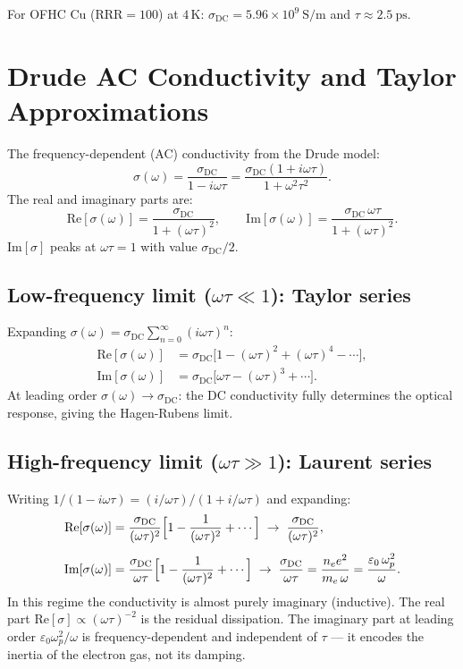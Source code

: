 \documentclass[11pt]{article}
\begin{document}
For OFHC Cu ($\mathrm{RRR}=100$) at $4\,\mathrm{K}$:
$\sigma_\mathrm{DC} = 5.96\times10^{9}\ \mathrm{S/m}$ and
$\tau \approx 2.5\ \mathrm{ps}$.

\section{Drude AC Conductivity and Taylor Approximations}
\label{sec:ac}

The frequency-dependent (AC) conductivity from the Drude model:
\[
  \sigma(\omega)
  = \frac{\sigma_\mathrm{DC}}{1 - i\omega\tau}
  = \frac{\sigma_\mathrm{DC}(1+i\omega\tau)}{1+\omega^2\tau^2}.
\]
The real and imaginary parts are:
\[
  \mathrm{Re}[\sigma(\omega)] = \frac{\sigma_\mathrm{DC}}{1+(\omega\tau)^2},
  \qquad
  \mathrm{Im}[\sigma(\omega)] = \frac{\sigma_\mathrm{DC}\,\omega\tau}{1+(\omega\tau)^2}.
\]
$\mathrm{Im}[\sigma]$ peaks at $\omega\tau = 1$ with value $\sigma_\mathrm{DC}/2$.

\subsection*{Low-frequency limit ($\omega\tau \ll 1$): Taylor series}

Expanding $\sigma(\omega) = \sigma_\mathrm{DC}\sum_{n=0}^\infty(i\omega\tau)^n$:
\begin{align*}
  \mathrm{Re}[\sigma(\omega)] &= \sigma_\mathrm{DC}
    \bigl[1 - (\omega\tau)^2 + (\omega\tau)^4 - \cdots\bigr], \\
  \mathrm{Im}[\sigma(\omega)] &= \sigma_\mathrm{DC}
    \bigl[\omega\tau - (\omega\tau)^3 + \cdots\bigr].
\end{align*}
At leading order $\sigma(\omega)\to\sigma_\mathrm{DC}$: the DC conductivity
fully determines the optical response, giving the Hagen-Rubens limit.

\subsection*{High-frequency limit ($\omega\tau \gg 1$): Laurent series}

Writing $1/(1-i\omega\tau) = (i/\omega\tau)/(1+i/\omega\tau)$ and expanding:
\begin{align*}
  \mathrm{Re}[\sigma(\omega)] &= \frac{\sigma_\mathrm{DC}}{(\omega\tau)^2}
    \Bigl[1 - \frac{1}{(\omega\tau)^2} + \cdots\Bigr]
    \;\to\; \frac{\sigma_\mathrm{DC}}{(\omega\tau)^2}, \\[4pt]
  \mathrm{Im}[\sigma(\omega)] &= \frac{\sigma_\mathrm{DC}}{\omega\tau}
    \Bigl[1 - \frac{1}{(\omega\tau)^2} + \cdots\Bigr]
    \;\to\; \frac{\sigma_\mathrm{DC}}{\omega\tau}
           = \frac{n_e e^2}{m_e\,\omega}
           = \frac{\varepsilon_0\,\omega_p^2}{\omega}.
\end{align*}
In this regime the conductivity is almost purely imaginary (inductive).
The real part $\mathrm{Re}[\sigma]\propto(\omega\tau)^{-2}$ is the residual
dissipation.  The imaginary part at leading order $\varepsilon_0\omega_p^2/\omega$
is frequency-dependent and independent of $\tau$ — it encodes the inertia of
the electron gas, not its damping.
\end{document}
